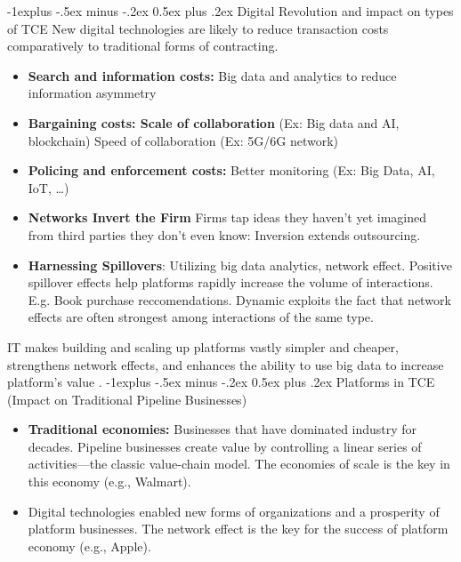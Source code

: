 \documentclass[12pt, landscape]{article}
\makeatletter
\renewcommand{\subsection}{\@startsection{subsection}{2}{0mm}%
                                {-1explus -.5ex minus -.2ex}%
                                {0.5ex plus .2ex}%
                                {\normalfont\normalsize\bfseries}}
\makeatother
\begin{document}
\begin{multicols*}{3}
\subsection{Digital Revolution and impact on types of TCE}
New digital technologies are likely to reduce transaction costs comparatively to traditional forms of contracting.
\begin{itemize}
\item \textbf{Search and information costs:} Big data and analytics to reduce information asymmetry
\item \textbf{Bargaining costs: Scale of collaboration} (Ex: Big data and AI, blockchain) Speed of collaboration (Ex: 5G/6G network)
\item \textbf{Policing and enforcement costs:} Better monitoring (Ex: Big Data, AI, IoT, …)
\item \textbf{Networks Invert the Firm} Firms tap ideas they haven’t yet imagined from third parties they don’t even know: Inversion extends outsourcing.
\item \textbf{Harnessing Spillovers}: Utilizing big data analytics, network effect. Positive spillover effects help platforms rapidly increase the volume of interactions. E.g. Book purchase reccomendations. Dynamic exploits the fact that network effects are often strongest among interactions of the same type.
\end{itemize}
IT makes building and scaling up platforms vastly simpler and cheaper, strengthens network effects, and enhances the ability to use big data to increase platform’s value .
\subsection{Platforms in TCE (Impact on Traditional Pipeline Businesses)}
\begin{itemize}
\item \textbf{Traditional economies:} Businesses that have dominated industry for decades. Pipeline businesses create value by controlling a linear series of activities—the classic value-chain model. The economies of scale is the key in this economy (e.g., Walmart).
\item Digital technologies enabled new forms of organizations and a prosperity of platform businesses. The network effect is the key for the success of platform economy (e.g., Apple).
\end{itemize}


\end{multicols*}
\end{document}
